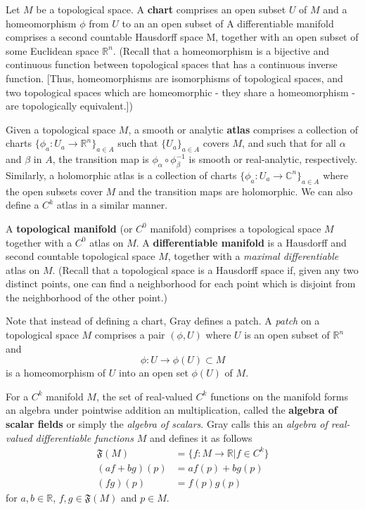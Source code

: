 \documentclass{book}
\begin{document}
		Let $M$ be a topological space. A \textbf{chart} comprises an open subset $U$ of $M$ and a homeomorphism $\phi$ from $U$ to an an open subset of  A differentiable manifold comprises a second countable Hausdorff space M, together with an open subset of some Euclidean space $\mathbb{R}^n$. (Recall that a homeomorphism is a bijective and continuous function between topological spaces that has a continuous inverse function. [Thus, homeomorphisms are isomorphisms of topological spaces, and two topological spaces which are homeomorphic - they share a homeomorphism - are topologically equivalent.])
		
		Given a topological space $M$, a smooth or analytic \textbf{atlas} comprises a collection of charts $\{\phi_a:U_a\rightarrow\mathbb{R}^n\}_{a\in A}$ such that $\{U_a\}_{a\in A}$ covers $M$, and such that for all $\alpha$ and $\beta$ in $A$, the transition map is $\phi_\alpha\circ\phi_\beta^{-1}$ is smooth or real-analytic, respectively. Similarly, a holomorphic atlas is a collection of charts $\{\phi_a:U_a\rightarrow\mathbb{C}^n\}_{a\in A}$ where the open subsets cover $M$ and the transition maps are holomorphic. We can also define a $C^k$ atlas in a similar manner.
		
		A \textbf{topological manifold} (or $C^0$ manifold) comprises a topological space $M$ together with a $C^0$ atlas on $M$. A \textbf{differentiable manifold} is a Hausdorff and second countable topological space $M$, together with a \emph{maximal differentiable} atlas on $M$. (Recall that a topological space is a Hausdorff space if, given any two distinct points, one can find a neighborhood for each point which is disjoint from the neighborhood of the other point.)
		
		Note that instead of defining a chart, Gray defines a patch. A \emph{patch} on a topological space $M$ comprises a pair $(\phi, U)$ where $U$ is an open subset of $\mathbb{R}^n$ and
		\begin{equation}
			\phi:U\rightarrow\phi(U)\subset M
		\end{equation}
		is a homeomorphism of $U$ into an open set $\phi(U)$ of $M$.
		
		For a $C^k$ manifold $M$, the set of real-valued $C^k$ functions on the manifold forms an algebra under pointwise addition an multiplication, called the \textbf{algebra of scalar fields} or simply the \emph{algebra of scalars}. Gray calls this an \emph{algebra of real-valued differentiable functions} $M$ and defines it as follows
		\begin{align}
			\mathfrak{F}(M)&=\{f:M\rightarrow\mathbb{R}|f\in C^k\}\\
			(af+bg)(p)&=af(p)+bg(p)\\
			(fg)(p)&=f(p)g(p)
		\end{align}
		for $a,b\in\mathbb{R}$, $f,g\in\mathfrak{F}(M)$ and $p\in M$.
		
\end{document}
